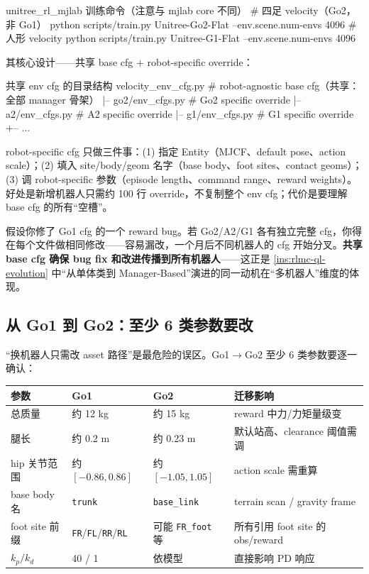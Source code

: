 \begin{codebox}[bash]{unitree\_rl\_mjlab 训练命令（注意与 mjlab core 不同）}
# 四足 velocity（Go2，非 Go1）
python scripts/train.py Unitree-Go2-Flat --env.scene.num-envs 4096
# 人形 velocity
python scripts/train.py Unitree-G1-Flat --env.scene.num-envs 4096
\end{codebox}

其核心设计——共享 base cfg + robot-specific override：

\begin{codebox}{共享 env cfg 的目录结构}
velocity_env_cfg.py        # robot-agnostic base cfg（共享：全部 manager 骨架）
|-- go2/env_cfgs.py        # Go2 specific override
|-- a2/env_cfgs.py         # A2 specific override
|-- g1/env_cfgs.py         # G1 specific override
+-- ...
\end{codebox}

robot-specific cfg 只做三件事：(1) 指定 Entity（MJCF、default pose、action scale）；(2) 填入 site/body/geom 名字（base body、foot sites、contact geoms）；(3) 调 robot-specific 参数（episode length、command range、reward weights）。好处是新增机器人只需约 100 行 override，不复制整个 env cfg；代价是要理解 base cfg 的所有“空槽”。

\begin{insight}\label{ins:rlmc-ql-sharecfg}
假设你修了 Go1 cfg 的一个 reward bug。若 Go2/A2/G1 各有独立完整 cfg，你得在每个文件做相同修改——容易漏改，一个月后不同机器人的 cfg 开始分叉。\textbf{共享 base cfg 确保 bug fix 和改进传播到所有机器人}——这正是 \cref{ins:rlmc-ql-evolution} 中“从单体类到 Manager-Based”演进的同一动机在“多机器人”维度的体现。
\end{insight}

\subsection{从 Go1 到 Go2：至少 6 类参数要改}
\label{sec:rlmc-ql-multirobot-migrate}

“换机器人只需改 asset 路径”是最危险的误区。Go1$\to$Go2 至少 6 类参数要逐一确认：

\begin{center}
\small
\begin{tabular}{@{}llll@{}}
\toprule
参数 & Go1 & Go2 & 迁移影响 \\
\midrule
总质量 & 约 12 kg & 约 15 kg & reward 中力/力矩量级变 \\
腿长 & 约 0.2 m & 约 0.23 m & 默认站高、clearance 阈值需调 \\
hip 关节范围 & 约 $[-0.86,0.86]$ & 约 $[-1.05,1.05]$ & action scale 需重算 \\
base body 名 & \verb|trunk| & \verb|base_link| & terrain scan / gravity frame \\
foot site 前缀 & \verb|FR|/\verb|FL|/\verb|RR|/\verb|RL| & 可能 \verb|FR_foot| 等 & 所有引用 foot site 的 obs/reward \\
$k_p/k_d$ & 40 / 1 & 依模型 & 直接影响 PD 响应 \\
\bottomrule
\end{tabular}
\end{center}

